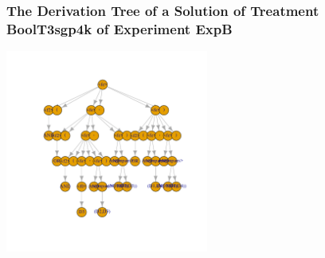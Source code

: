  \begin{frame}
 \frametitle{ The Derivation Tree of a Solution of Treatment BoolT3sgp4k of Experiment ExpB }
 \begin{center}
\includegraphics[width=0.5\textwidth, angle=0]
{ExpBDerivationTreeFigure017.pdf}
 \end{center}
 \label{report/ExpBDerivationTreeFigure017.pdf}  
 \end{frame}

